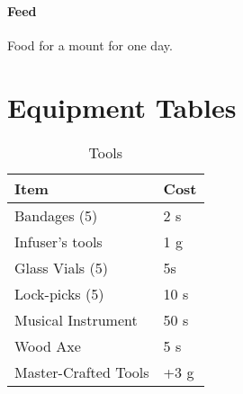 \documentclass[a4paper,11pt,oneside]{book}
\begin{document}
\subsubsection*{Feed}
Food for a mount for one day.

\chapter{Equipment Tables}
\begin{table}[ht]
	\centering
	\caption{Tools}
	\begin{tabular}{|l|l|}
		\hline
		Item & Cost\\ [0.5ex]
		\hline
		Bandages (5)& 2 s\\
		Infuser's tools & 1 g\\
		Glass Vials (5)& 5s\\
		Lock-picks (5) & 10 s\\
		Musical Instrument & 50 s\\
		Wood Axe & 5 s\\		
		\hline
		Master-Crafted Tools & +3 g\\
		\hline
	\end{tabular}
\end{table}
\end{document}
